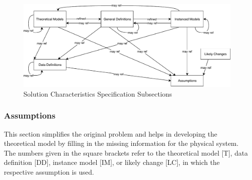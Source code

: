 \documentclass[12pt]{article}
\begin{document}
\begin{figure}[H]
  \includegraphics[scale=0.9]{RelationsBetweenTM_GD_IM_DD_A.pdf}
  \caption{Solution Characteristics Specification Subsections}
\label{Fig_SolChar}
\end{figure}


\subsubsection{Assumptions} \label{sec_assumpt}


This section simplifies the original problem and helps in developing the
theoretical model by filling in the missing information for the physical
system. The numbers given in the square brackets refer to the theoretical model
[T], data definition [DD], instance model [IM], or
likely change [LC], in which the respective assumption is used.
\end{document}
